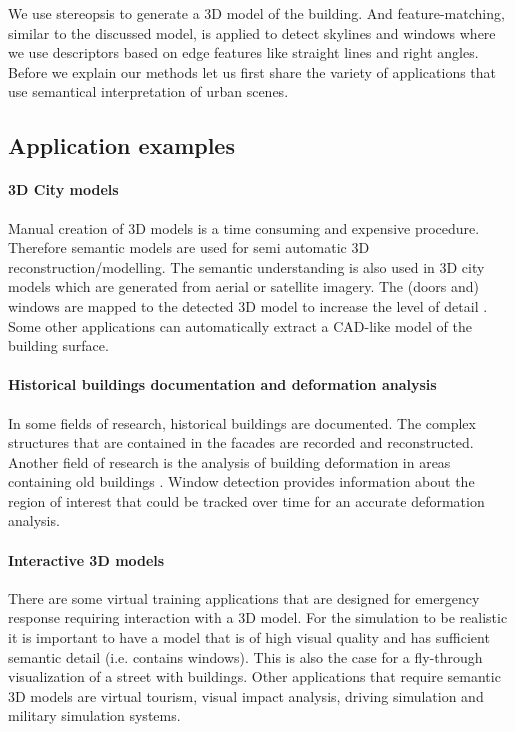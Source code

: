 We use stereopsis to generate a 3D model of the building.  And feature-matching,
similar to the discussed model, is applied to detect skylines and windows where
we use descriptors based on edge features like straight lines and right angles.
Before we explain our methods let us first share the variety of applications 
that use semantical interpretation of urban scenes.  \\
\clearpage

\subsection{Application examples}
\paragraph{3D City models} 
	Manual creation of 3D models is a time consuming and expensive procedure.
	Therefore semantic models are used for semi automatic 3D
	reconstruction/modelling.
	The semantic understanding is also used in 3D city models which are
	generated from aerial or satellite imagery.  The (doors and) windows are mapped to the detected 3D model to increase the level of detail \cite{Muller_procedural2}. 
	Some other applications can automatically extract a CAD-like model of
	the building surface.

\paragraph{Historical buildings documentation and deformation analysis}
	In some fields of research, historical buildings are documented.  The complex
	structures that are contained in the facades are recorded and reconstructed.
	Another field of research is the analysis of building deformation in areas
	containing old buildings \cite{deformation}.
	 Window detection provides information about the
	region of interest that could be tracked over time for an accurate
	deformation analysis.

\paragraph{Interactive 3D models}
	There are some virtual training applications that are designed for
	emergency response requiring interaction with a 3D model.  
	For the simulation to be realistic it is important to have a model that is
	of high visual quality and has sufficient semantic detail (i.e. contains
	windows).  This is also the case for a fly-through visualization of a street with
	buildings.
	Other applications that require semantic 3D models are virtual tourism,
	visual impact analysis, driving simulation and military simulation systems.

